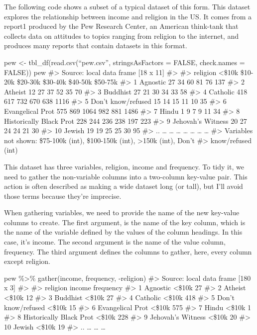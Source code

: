 \documentclass[]{article}
\begin{document}
The following code shows a subset of a typical dataset of this form.
This dataset explores the relationship between income and religion in
the US. It comes from a report1 produced by the Pew Research Center, an
American think-tank that collects data on attitudes to topics ranging
from religion to the internet, and produces many reports that contain
datasets in this format.

pew \textless{}- tbl\_df(read.csv(``pew.csv'', stringsAsFactors = FALSE,
check.names = FALSE)) pew \#\textgreater{} Source: local data frame
{[}18 x 11{]} \#\textgreater{} \#\textgreater{} religion
\textless{}\$10k \$10-20k \$20-30k \$30-40k \$40-50k \$50-75k
\#\textgreater{} 1 Agnostic 27 34 60 81 76 137 \#\textgreater{} 2
Atheist 12 27 37 52 35 70 \#\textgreater{} 3 Buddhist 27 21 30 34 33 58
\#\textgreater{} 4 Catholic 418 617 732 670 638 1116 \#\textgreater{} 5
Don't know/refused 15 14 15 11 10 35 \#\textgreater{} 6 Evangelical Prot
575 869 1064 982 881 1486 \#\textgreater{} 7 Hindu 1 9 7 9 11 34
\#\textgreater{} 8 Historically Black Prot 228 244 236 238 197 223
\#\textgreater{} 9 Jehovah's Witness 20 27 24 24 21 30 \#\textgreater{}
10 Jewish 19 19 25 25 30 95 \#\textgreater{} .. \ldots{} \ldots{}
\ldots{} \ldots{} \ldots{} \ldots{} \ldots{} \#\textgreater{} Variables
not shown: \$75-100k (int), \$100-150k (int), \textgreater{}150k (int),
Don't \#\textgreater{} know/refused (int)

This dataset has three variables, religion, income and frequency. To
tidy it, we need to gather the non-variable columns into a two-column
key-value pair. This action is often described as making a wide dataset
long (or tall), but I'll avoid those terms because they're imprecise.

When gathering variables, we need to provide the name of the new
key-value columns to create. The first argument, is the name of the key
column, which is the name of the variable defined by the values of the
column headings. In this case, it's income. The second argument is the
name of the value column, frequency. The third argument defines the
columns to gather, here, every column except religion.

pew \%\textgreater{}\% gather(income, frequency, -religion)
\#\textgreater{} Source: local data frame {[}180 x 3{]} \#\textgreater{}
\#\textgreater{} religion income frequency \#\textgreater{} 1 Agnostic
\textless{}\$10k 27 \#\textgreater{} 2 Atheist \textless{}\$10k 12
\#\textgreater{} 3 Buddhist \textless{}\$10k 27 \#\textgreater{} 4
Catholic \textless{}\$10k 418 \#\textgreater{} 5 Don't know/refused
\textless{}\$10k 15 \#\textgreater{} 6 Evangelical Prot \textless{}\$10k
575 \#\textgreater{} 7 Hindu \textless{}\$10k 1 \#\textgreater{} 8
Historically Black Prot \textless{}\$10k 228 \#\textgreater{} 9
Jehovah's Witness \textless{}\$10k 20 \#\textgreater{} 10 Jewish
\textless{}\$10k 19 \#\textgreater{} .. \ldots{} \ldots{} \ldots{}
\end{document}
